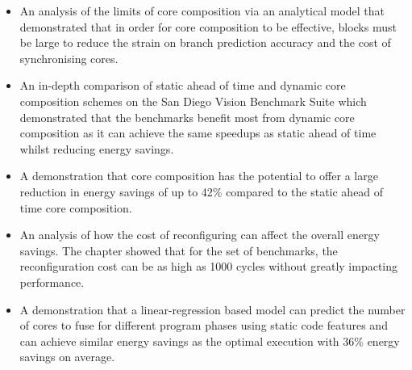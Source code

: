 \begin{itemize}
\item An analysis of the limits of core composition via an analytical model that demonstrated that in order for core composition to be effective, blocks must be large to reduce the strain on branch prediction accuracy and the cost of synchronising cores.
\vspace{-0.5em}
\item An in-depth comparison of static ahead of time and dynamic core composition schemes on the San Diego Vision Benchmark Suite which demonstrated that the benchmarks benefit most from dynamic core composition as it can achieve the same speedups as static ahead of time whilst reducing energy savings.
\vspace{-0.5em}
\item A demonstration that core composition has the potential to offer a large reduction in energy savings of up to 42\% compared to the static ahead of time core composition.
\vspace{-0.5em}
\item An analysis of how the cost of reconfiguring can affect the overall energy savings. The chapter showed that for the set of benchmarks, the reconfiguration cost can be as high as 1000 cycles without greatly impacting performance.
\vspace{-0.5em}
\item A demonstration that a linear-regression based model can predict the number of cores to fuse for different program phases using static code features and can achieve similar energy savings as the optimal execution with 36\% energy savings on average.
\end{itemize} 




